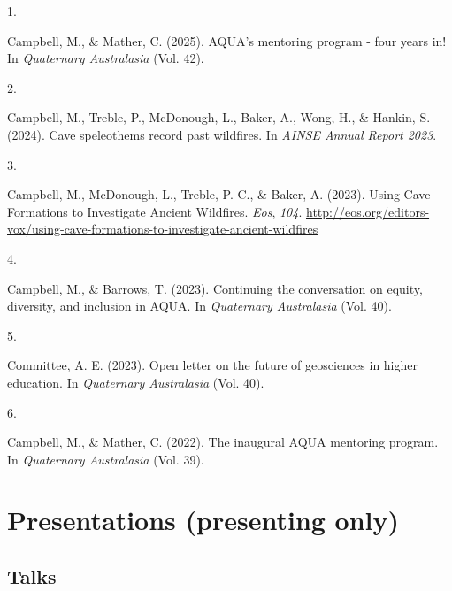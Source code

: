 \documentclass[11pt,a4paper,]{moderncv}
\newlength{\csllabelwidth}
\newcommand{\CSLLeftMargin}[1]{\parbox[t]{\csllabelwidth}{#1}}
\newcommand{\CSLRightInline}[1]{\parbox[t]{\linewidth - \csllabelwidth}{#1}}
\begin{document}
\hypertarget{bibliography}{}
\leavevmode{}%
\CSLLeftMargin{1. }%
\CSLRightInline{Campbell, M., \& Mather, C. (2025). AQUA's mentoring
program - four years in! In \emph{Quaternary Australasia} (Vol. 42).}

\leavevmode{}%
\CSLLeftMargin{2. }%
\CSLRightInline{Campbell, M., Treble, P., McDonough, L., Baker, A.,
Wong, H., \& Hankin, S. (2024). Cave speleothems record past wildfires.
In \emph{AINSE Annual Report 2023}.}

\leavevmode{}%
\CSLLeftMargin{3. }%
\CSLRightInline{Campbell, M., McDonough, L., Treble, P. C., \& Baker, A.
(2023). Using Cave Formations to Investigate Ancient Wildfires.
\emph{Eos}, \emph{104}.
\url{http://eos.org/editors-vox/using-cave-formations-to-investigate-ancient-wildfires}}

\leavevmode{}%
\CSLLeftMargin{4. }%
\CSLRightInline{Campbell, M., \& Barrows, T. (2023). Continuing the
conversation on equity, diversity, and inclusion in AQUA. In
\emph{Quaternary Australasia} (Vol. 40).}

\leavevmode{}%
\CSLLeftMargin{5. }%
\CSLRightInline{Committee, A. E. (2023). Open letter on the future of
geosciences in higher education. In \emph{Quaternary Australasia} (Vol.
40).}

\leavevmode{}%
\CSLLeftMargin{6. }%
\CSLRightInline{Campbell, M., \& Mather, C. (2022). The inaugural AQUA
mentoring program. In \emph{Quaternary Australasia} (Vol. 39).}

\hypertarget{presentations-presenting-only}{%
\section{Presentations (presenting
only)}\label{presentations-presenting-only}}

\hypertarget{talks}{%
\subsection{Talks}\label{talks}}
\end{document}
